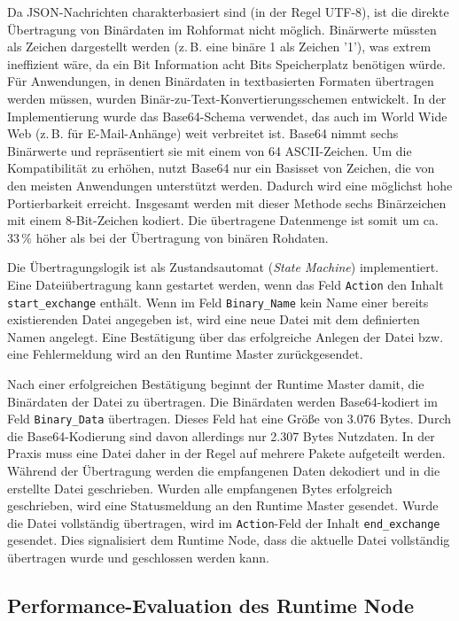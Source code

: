 Da \gls{JSON}-Nachrichten charakterbasiert sind (in der Regel UTF-8), ist die direkte Übertragung von Binärdaten im Rohformat nicht möglich. Binärwerte müssten als Zeichen dargestellt werden (z.\,B. eine binäre 1 als Zeichen '1'), was extrem ineffizient wäre, da ein Bit Information acht Bits Speicherplatz benötigen würde. Für Anwendungen, in denen Binärdaten in textbasierten Formaten übertragen werden müssen, wurden Binär-zu-Text-Konvertierungsschemen entwickelt. In der Implementierung wurde das Base64-Schema verwendet, das auch im World Wide Web (z.\,B. für E-Mail-Anhänge) weit verbreitet ist. Base64 nimmt sechs Binärwerte und repräsentiert sie mit einem von 64 \gls{ASCII}-Zeichen. Um die Kompatibilität zu erhöhen, nutzt Base64 nur ein Basisset von Zeichen, die von den meisten Anwendungen unterstützt werden. Dadurch wird eine möglichst hohe Portierbarkeit erreicht. Insgesamt werden mit dieser Methode sechs Binärzeichen mit einem 8-Bit-Zeichen kodiert. Die übertragene Datenmenge ist somit um ca. 33\,\% höher als bei der Übertragung von binären Rohdaten.

Die Übertragungslogik ist als Zustandsautomat (\textit{State Machine}) implementiert. Eine Dateiübertragung kann gestartet werden, wenn das Feld \texttt{Action} den Inhalt \texttt{start\_exchange} enthält. Wenn im Feld \texttt{Binary\_Name} kein Name einer bereits existierenden Datei angegeben ist, wird eine neue Datei mit dem definierten Namen angelegt. Eine Bestätigung über das erfolgreiche Anlegen der Datei bzw. eine Fehlermeldung wird an den Runtime Master zurückgesendet.

Nach einer erfolgreichen Bestätigung beginnt der Runtime Master damit, die Binärdaten der Datei zu übertragen. Die Binärdaten werden Base64-kodiert im Feld \texttt{Binary\_Data} übertragen. Dieses Feld hat eine Größe von 3.076 Bytes. Durch die Base64-Kodierung sind davon allerdings nur 2.307 Bytes Nutzdaten. In der Praxis muss eine Datei daher in der Regel auf mehrere Pakete aufgeteilt werden. Während der Übertragung werden die empfangenen Daten dekodiert und in die erstellte Datei geschrieben. Wurden alle empfangenen Bytes erfolgreich geschrieben, wird eine Statusmeldung an den Runtime Master gesendet. Wurde die Datei vollständig übertragen, wird im \texttt{Action}-Feld der Inhalt \texttt{end\_exchange} gesendet. Dies signalisiert dem Runtime Node, dass die aktuelle Datei vollständig übertragen wurde und geschlossen werden kann.

\subsection{Performance-Evaluation des Runtime Node}
\label{sec:PerformanceEvaluationDesRuntimeNode}

